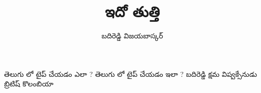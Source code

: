 \documentclass[12pt]{article}
\title{ఇదో తుత్తి}
\author{బదిరెడ్డి విజయబాస్కర్}
\begin{document}
\maketitle
తెలుగు లో టైప్ చేయడం ఎలా ?
తెలుగు లో టైప్ చేయడం ఇలా ?
బదిరెడ్డి క్షమ విష్వక్సేనుడు బ్రిటిష్ కొలంబియా
\end{document}
